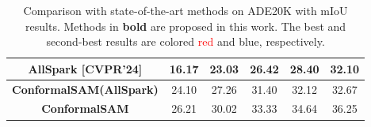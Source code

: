 \begin{table}[]
{\begin{tabular}{c|ccccc}
AllSpark \cite{wang2024allspark} \textcolor[HTML]{9B9B9B}{\scriptsize[{CVPR'24}]}  & 16.17                                                 & 23.03                                                 & 26.42                                                 & 28.40                                                 & 32.10                                                \\ \hline
\textbf{ConformalSAM(AllSpark)}      & {\color[HTML]{00B0F0} 24.10}                          & {\color[HTML]{00B0F0} 27.26}                          & {\color[HTML]{00B0F0} 31.40}                          &  32.12                                                & 32.67       \\
\textbf{ConformalSAM}               & {\color[HTML]{FE0000} 26.21}                          & {\color[HTML]{FE0000} 30.02}                          & {\color[HTML]{FE0000} 33.33}                          & {\color[HTML]{FE0000} 34.64}                          & {\color[HTML]{00B0F0} 36.25}                         \\ \hline
\end{tabular}
}
\vspace{-0.3cm}
\caption{\textnormal{Comparison with state-of-the-art methods on ADE20K with mIoU results. Methods in \textbf{bold} are proposed in this work. The best and second-best results are colored \textcolor{red}{red} and {\color[HTML]{00B0F0} blue}, respectively.}}
\vspace{-0.6cm}
\label{table3}
\end{table}

